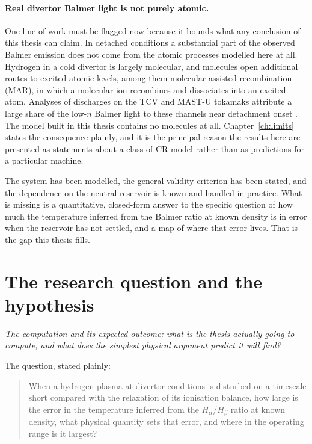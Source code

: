 \paragraph{Real divertor Balmer light is not purely atomic.} One line of work
must be flagged now because it bounds what any conclusion of this thesis can
claim. In detached conditions a substantial part of the observed Balmer emission
does not come from the atomic processes modelled here at all. Hydrogen in a cold
divertor is largely molecular, and molecules open additional routes to excited
atomic levels, among them molecular-assisted recombination (MAR), in which a
molecular ion recombines and dissociates into an excited atom. Analyses of
discharges on the TCV and MAST-U tokamaks attribute a large share of the low-$n$ Balmer light to
these channels near detachment onset \cite{Verhaegh2021, Wijkamp2023}. The model
built in this thesis contains no molecules at all. Chapter~\ref{ch:limits} states
the consequence plainly, and it is the principal reason the results here are
presented as statements about a class of CR model rather than as predictions for
a particular machine.

\medskip

The system has been modelled, the general validity criterion has been stated,
and the dependence on the neutral reservoir is known and handled in practice. What is missing is a quantitative, closed-form answer to the specific
question of how much the temperature inferred from the Balmer ratio at known
density is in error when the reservoir has not settled, and a map of where that error lives. That is
the gap this thesis fills.

\section{The research question and the hypothesis}
\label{sec:question}

\emph{The computation and its expected outcome: what is the thesis actually going to compute, and what does
the simplest physical argument predict it will find?}

The question, stated plainly:

\begin{quote}
When a hydrogen plasma at divertor conditions is disturbed on a timescale short
compared with the relaxation of its ionisation balance, how large is the error in
the temperature inferred from the $H_\alpha/H_\beta$ ratio at known density, what
physical quantity
sets that error, and where in the operating range is it largest?
\end{quote}

